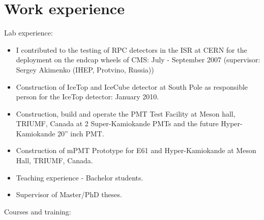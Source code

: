 \documentclass[11pt,a4paper,oneside,fleqn]{article}
\begin{document}





\section{Work experience}
Lab experience: 
\begin{itemize}
\item I contributed to the testing of RPC detectors in the ISR at CERN for the deployment on the endcap wheels of CMS: July - September 2007 (supervisor: Sergey Akimenko (IHEP, Protvino, Russia)) %
\item Construction of IceTop and IceCube detector at South Pole as responsible person for the IceTop detector: January 2010.
\item Construction, build and operate the PMT Test Facility at Meson hall, TRIUMF, Canada at 2 Super-Kamiokande PMTs and the future Hyper-Kamiokande 20'' inch PMT.
\item Construction of mPMT Prototype for E61 and Hyper-Kamiokande at Meson Hall, TRIUMF, Canada.
\end{itemize}
\begin{itemize}
\item Teaching experience - Bachelor students.
\item Supervisor of Master/PhD theses.
\end{itemize}
Courses and training:
\end{document}
